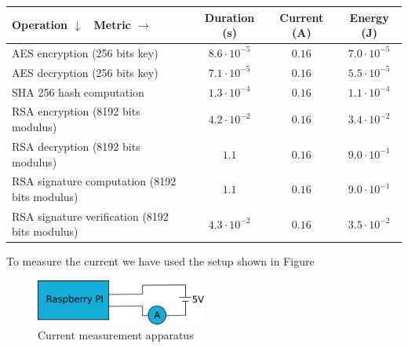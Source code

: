 \begin{table}
	\begin{tabular}{|l|c|c|c|}
	\hline
	Operation $\downarrow$ \ Metric $\rightarrow$ & Duration (s) & Current (A) & Energy (J) \\\hline
	AES encryption (256 bits key) & $8.6\cdot10^{-5}$ & $0.16$ & $7.0\cdot10^{-5}$\\\hline
	AES decryption (256 bits key) & $7.1\cdot10^{-5}$ & $0.16$ & $5.5\cdot10^{-5}$ \\\hline
	SHA 256 hash computation & $1.3\cdot10^{-4}$ & $0.16$ & $1.1\cdot10^{-4}$ \\\hline
	RSA encryption (8192 bits modulus) & $4.2\cdot10^{-2}$ & $0.16$ & $3.4\cdot10^{-2}$ \\\hline
	RSA decryption (8192 bits modulus) & $1.1$ & $0.16$ & $9.0\cdot10^{-1}$\\\hline
	RSA signature computation (8192 bits modulus) & $1.1$ & $0.16$ & $9.0\cdot10^{-1}$ \\\hline
	RSA signature verification (8192 bits modulus) & $4.3\cdot10^{-2}$ & $0.16$ & $3.5\cdot10^{-2}$ \\\hline
	\end{tabular}
	\label{fig:measurements}
\end{table}

To measure the current we have used the setup shown in Figure~\cite{fig:current_measurement}

\begin{figure}[!h]
	\includegraphics[width=0.5\textwidth]{graphics/current_measurement_aparatus.png}
	\caption{Current measurement apparatus}
	\label{fig:current_measurement}
\end{figure}

